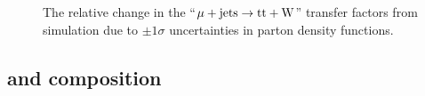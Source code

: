 \begin{figure}[!h]
{  } \\
   ~
  \caption{\label{fig:tfSyst_pdf_muToTtw} The relative change in the
    ``$\mu + \textrm{jets} \rightarrow \mathrm{tt+W}$'' transfer factors from
    simulation due to $\pm1\sigma$ uncertainties in parton density
    functions.  } 
\end{figure}

\clearpage
\subsection{\texorpdfstring{\wj}{W+jets} and \texorpdfstring{\ttbar}{TTbar} composition}

